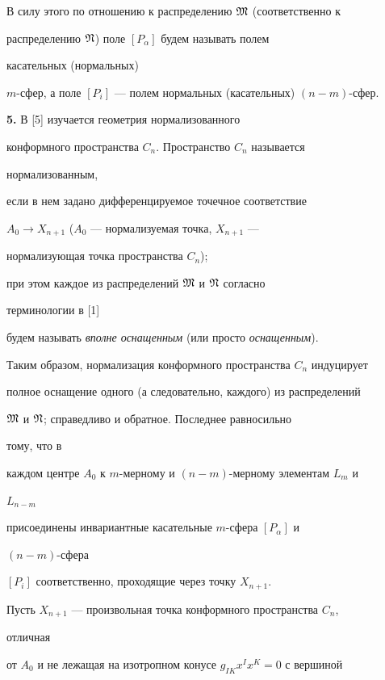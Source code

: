  


В силу этого по отношению к распределению $\frak M$ (соответственно к 


распределению $\frak N$) поле $[P_\alpha]$ будем называть полем 


касательных (нормальных) 


$m$-сфер, а поле $[P_i]$ --- полем нормальных (касательных) $(n-m)$-сфер. 


\medskip 


 


{\bf 5.} В [5] изучается геометрия нормализованного 


конформного пространства $C_n$. Пространство $C_n$ называется 


нормализованным, 


если в нем задано дифференцируемое точечное соответствие 


$A_0\to X_{n+1}$ ($A_0$ --- нормализуемая точка, $X_{n+1}$ --- 


нормализующая точка пространства $C_n$); 


при этом каждое из распределений $\frak M$ и $\frak N$ согласно 


терминологии в [1] 


будем называть {\it вполне оснащенным} (или просто {\it оснащенным}). 


 


Таким образом, нормализация конформного пространства $C_n$ индуцирует 


полное оснащение одного (а следовательно, каждого) из распределений 


$\frak M$ и $\frak N$; справедливо и обратное. Последнее равносильно 


тому, что в 


каждом центре $A_0$ к $m$-мерному и $(n-m)$-мерному элементам $L_m$ и 


$L_{n-m}$ 


присоединены инвариантные касательные $m$-сфера $[P_\alpha]$ и 


$(n-m)$-сфера 


$[P_i]$ соответственно, проходящие через точку $X_{n+1}$. 


 


Пусть $X_{n+1}$ --- произвольная точка конформного пространства $C_n$, 


отличная 


от $A_0$ и не лежащая на изотропном конусе $g_{IK}x^I x^K=0$ с вершиной 


